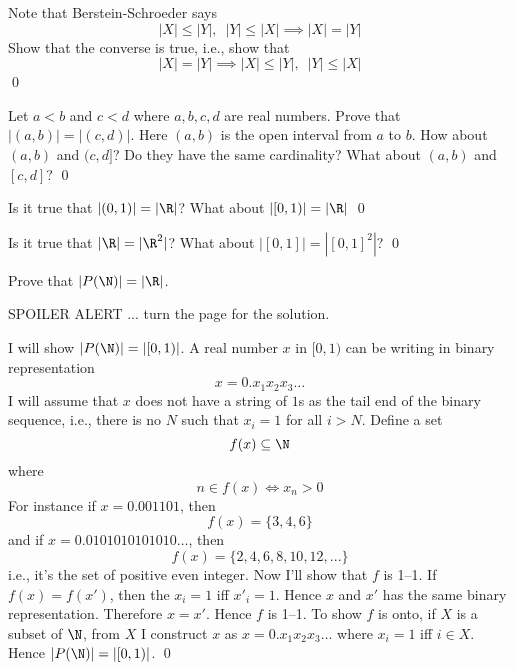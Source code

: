 \newpage
\begin{ex}
  Note that Berstein-Schroeder says
  \[
  |X| \leq |Y|, \,\,\, |Y| \leq |X| \implies
  |X| = |Y|
  \]
  Show that the converse is true, i.e., show that
  \[
  |X| = |Y|
  \implies
  |X| \leq |Y|, \,\,\, |Y| \leq |X| 
  \]
  \qed
\end{ex}

\newpage
\begin{ex}
  Let $a < b$ and $c < d$ where $a,b,c,d$ are real
  numbers.
  Prove that $|(a, b)| = |(c, d)|$.
  Here $(a, b)$ is the open interval from $a$ to $b$.
  How about $(a, b)$ and $(c, d]$?
    Do they have the same cardinality?
    What about $(a, b)$ and $[c, d]$?
    \qed
\end{ex}
\begin{comment}
  |(0, 1)| = |(0, x)| where x > 0: easy.
  |(0, 1)| = |(a, a+1)|: easy.

  |(0,1)| = |(0, 1]|:
    \leq is easy by inclusion.
    \geq use map x -> x/2.
    Therefore by bernstein schroeder ... done.
\end{comment}   

\newpage
\begin{ex}
  Is it true that $|(0, 1)| = |\R|$?
  What about $|[0, 1)| = |\R|$ 
  \qed
\end{ex}

\begin{ex}
  Is it true that $|\R| = |\R^2|$?
  What about $|[0,1]| = |[0,1]^2|$?
  \qed
\end{ex}
\begin{comment}
  |[0,1]| = |[0,1]^2|:
  \leq is easy
  \geq: let (x, y) \in [0,1]^2. interleave digits of x,y to get z in [0,1].
\end{comment}


\newpage
\begin{ex}
  Prove that $|P(\N)| = |\R|$.
\end{ex}

SPOILER ALERT ... turn the page for the solution.

\newpage
\proof
I will show $|P(\N)| = |[0, 1)|$.
A real number $x$ in $[0, 1)$ can be writing in binary representation
  \[
  x = 0.x_1 x_2 x_3 \ldots
  \]
  I will assume that $x$ does not have a string of $1$s as the tail end
  of the binary sequence, i.e., there is no $N$ such that
  $x_i = 1$ for all $i > N$.
  Define
  a set
  \[
  f(x) \subseteq \N
  \]
  where
  \[
  n \in f(x) \iff x_n > 0
  \]
  For instance if $x = 0.001101$, then
  \[
  f(x) = \{3,4,6\}
  \]
  and if $x = 0.0101010101010\ldots$, then
  \[
  f(x) = \{2, 4, 6, 8,10, 12, ...\} 
  \]
  i.e., it's the set of positive even integer.
  Now I'll show that $f$ is 1--1.
  If $f(x) = f(x')$, then the
  $x_i = 1$ iff $x'_i = 1$.
  Hence $x$ and $x'$ has the same binary representation.
  Therefore $x = x'$.
  Hence $f$ is 1--1.
  To show $f$ is onto,
  if $X$ is a subset of $\N$, from $X$ I construct $x$ as
  $x = 0.x_1 x_2 x_3 \ldots$ where $x_i = 1$ iff $i \in X$.
  Hence $|P(\N)| = |[0,1)|$.
  \qed

